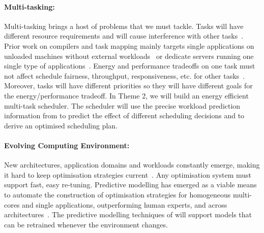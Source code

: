 \paragraph{Multi-tasking:} Multi-tasking brings a host of problems that we must
tackle. Tasks will have different resource requirements and will cause
interference with other tasks~\cite{zheng-cgo}. Prior work on compilers and
task mapping mainly targets single applications on unloaded machines without
external workloads~\cite{5375318,Raman:2012} or dedicate servers running one single
type of applications~\cite{Agarwal:2012:RDC:2228298.2228327}.
Energy and performance tradeoffs
on one task must not affect schedule fairness, throughput, responsiveness, etc.
for other tasks~\cite{Esmaeilzadeh:2012:LBL:2209249.2209272}. Moreover, tasks
will have different priorities so they will have different goals for the
energy/performance tradeoff. In Theme 2, we will build an energy efficient
multi-task scheduler. The scheduler will use the precise workload prediction
information from  to predict the effect of different scheduling decisions
and to derive an optimised scheduling plan.

\paragraph{Evolving Computing Environment:} New architectures, application
domains and workloads constantly emerge, making it hard to keep optimisation
strategies current~\cite{5375327}. Any optimisation system must support fast,
easy re-tuning. Predictive modelling
has emerged as a viable means to automate the construction of optimisation
strategies for homogeneous multi-cores and single applications, outperforming
human experts, and across architectures~\cite{Stephenson:2003,Wang-pact}. The
predictive modelling techniques of  will support models that can be
retrained whenever the environment changes.
